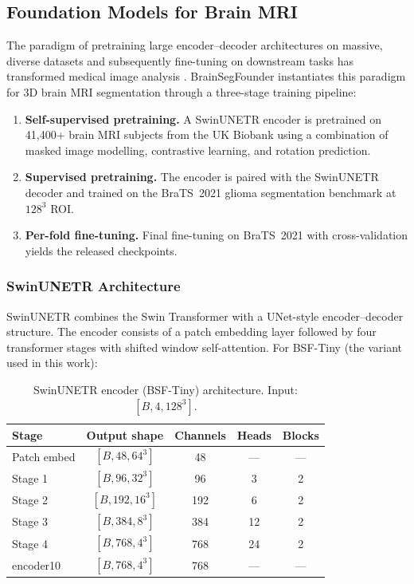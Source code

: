 \subsection{Foundation Models for Brain MRI}
\label{sec:bg:foundation}

The paradigm of pretraining large encoder--decoder architectures on massive,
diverse datasets and subsequently fine-tuning on downstream tasks has
transformed medical image analysis \cite{he2023foundation,moor2023foundation}.
BrainSegFounder \cite{cox2024brainsegfounder} instantiates this paradigm for
3D brain MRI segmentation through a three-stage training pipeline:

\begin{enumerate}[leftmargin=*]
  \item \textbf{Self-supervised pretraining.} A SwinUNETR encoder
    \cite{hatamizadeh2022swinunetr,tang2022self} is pretrained on 41,400+
    brain MRI subjects from the UK Biobank using a combination of masked image
    modelling, contrastive learning, and rotation prediction.

  \item \textbf{Supervised pretraining.} The encoder is paired with the
    SwinUNETR decoder and trained on the BraTS~2021 glioma segmentation
    benchmark \cite{baid2021rsna} at $128^3$ ROI.

  \item \textbf{Per-fold fine-tuning.} Final fine-tuning on BraTS~2021 with
    cross-validation yields the released checkpoints.
\end{enumerate}

\subsubsection{SwinUNETR Architecture}

SwinUNETR combines the Swin Transformer \cite{liu2021swin} with a
UNet-style encoder--decoder structure. The encoder consists of a patch
embedding layer followed by four transformer stages with shifted window
self-attention. For BSF-Tiny (the variant used in this work):

\begin{table}[H]
  \centering
  \caption{SwinUNETR encoder (BSF-Tiny) architecture. Input: $[B, 4, 128^3]$.}
  \label{tab:swinunetr_arch}
  \begin{tabular}{lcccc}
    \toprule
    \textbf{Stage} & \textbf{Output shape} & \textbf{Channels} & \textbf{Heads} & \textbf{Blocks} \\
    \midrule
    Patch embed & $[B, 48, 64^3]$  & 48  & --- & --- \\
    Stage 1     & $[B, 96, 32^3]$  & 96  & 3   & 2 \\
    Stage 2     & $[B, 192, 16^3]$ & 192 & 6   & 2 \\
    Stage 3     & $[B, 384, 8^3]$  & 384 & 12  & 2 \\
    Stage 4     & $[B, 768, 4^3]$  & 768 & 24  & 2 \\
    encoder10   & $[B, 768, 4^3]$  & 768 & --- & --- \\
    \bottomrule
  \end{tabular}
\end{table}

